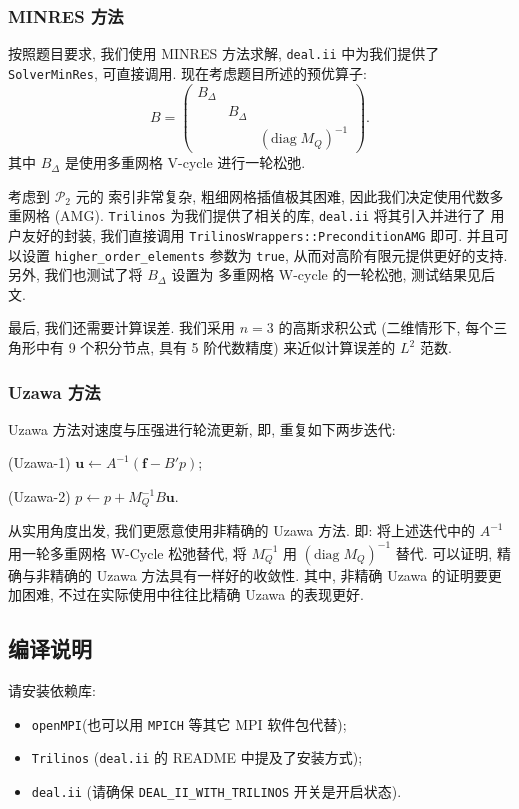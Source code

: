 \documentclass[lang=cn,11pt,a4paper]{elegantpaper}
\begin{document}
\subsubsection{MINRES 方法}

按照题目要求, 我们使用 MINRES 方法求解, \verb|deal.ii| 中为我们提供了
\verb|SolverMinRes|, 可直接调用. 现在考虑题目所述的预优算子: 
\begin{equation}
    B=\begin{pmatrix}
        B_\Delta & &\\
        & B_\Delta &\\
        & & (\text{diag}\; M_Q)^{-1}
    \end{pmatrix}.
\end{equation}
其中 $B_\Delta$ 是使用多重网格 V-cycle 进行一轮松弛. 

考虑到 $\mathcal{P}_2$ 元的
索引非常复杂, 粗细网格插值极其困难, 因此我们决定使用代数多重网格 (AMG). 
\verb|Trilinos| 为我们提供了相关的库, \verb|deal.ii| 将其引入并进行了
用户友好的封装, 我们直接调用 \verb|TrilinosWrappers::PreconditionAMG| 即可. 
并且可以设置 \verb|higher_order_elements| 参数为 \verb|true|, 
从而对高阶有限元提供更好的支持. 另外, 我们也测试了将 $B_\Delta$ 设置为
多重网格 W-cycle 的一轮松弛, 测试结果见后文.

最后, 我们还需要计算误差. 我们采用 $n=3$ 的高斯求积公式
(二维情形下, 每个三角形中有 9 个积分节点, 具有 5 阶代数精度)
来近似计算误差的 $L^2$ 范数. 

\subsubsection{Uzawa 方法}

Uzawa 方法对速度与压强进行轮流更新, 即, 重复如下两步迭代:

(Uzawa-1) $\mathbf{u} \gets A^{-1}(\mathbf{f}-B'p)$;

(Uzawa-2) $p \gets p + M_Q^{-1}B\mathbf{u}$.

从实用角度出发, 我们更愿意使用非精确的 Uzawa 方法. 
即: 将上述迭代中的
$A^{-1}$ 用一轮多重网格 W-Cycle 松弛替代, 
将 $M_Q^{-1}$ 用 $(\text{diag}\; M_Q)^{-1}$ 替代. 
可以证明, 精确与非精确的 Uzawa 方法具有一样好的收敛性.
 其中, 非精确 Uzawa 的证明要更加困难, 
不过在实际使用中往往比精确 Uzawa 的表现更好.

\subsection{编译说明}

请安装依赖库: 
\begin{itemize}
    \item \verb|openMPI|(也可以用 \verb|MPICH| 等其它 MPI 软件包代替); 
    \item \verb|Trilinos| (\verb|deal.ii| 的 README 中提及了安装方式); 
    \item \verb|deal.ii| (请确保 \verb|DEAL_II_WITH_TRILINOS| 开关是开启状态). 
\end{itemize}
\end{document}
